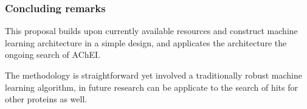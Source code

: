 \subsubsection{Concluding remarks}

This proposal builds upon currently available resources and construct machine learning architecture in a simple design, and applicates the architecture the ongoing search of AChEI.

The methodology is straightforward yet involved a traditionally robust machine learning algorithm, in future research can be applicate to the search of hits for other proteins as well.
